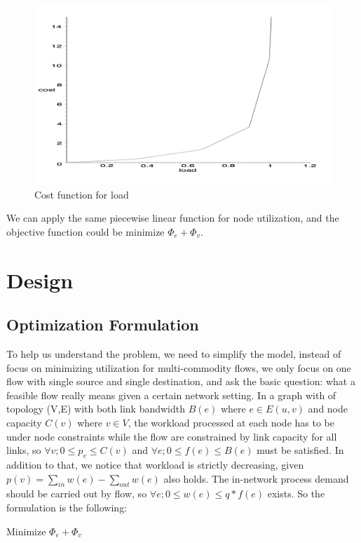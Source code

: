 \documentclass{sig-alternate}
\begin{document}
\begin{figure}
\includegraphics[scale=0.25]{piecewise.png} 
\caption{Cost function for load \label{figure1}}
 \end{figure}
 
 We can apply the same piecewise linear function for node utilization, and the objective function could be minimize 
 $\Phi_e + \Phi_v$.



\section{Design}
\subsection{Optimization Formulation}
To help us understand the problem, we need to simplify the model, instead of focus on minimizing utilization for multi-commodity flows, we only focus on one flow with single source and single destination, and ask the basic question: what a feasible flow really means given a certain network setting. In a graph with of topology (V,E) with both link bandwidth $B(e)$ where $e \in E(u,v)$ and node capacity $C(v)$ where $v \in V$, the workload processed at each node has to be under node constraints while the flow are constrained by link capacity for all links, so 
$\forall v; 0\leq p_v\leq C(v) $ and $\forall e; 0\leq f(e)\leq B(e)$ must be satisfied. In addition to that, we notice that workload is strictly decreasing, given $p(v) = \sum\limits_{in } w(e) - \sum\limits_{out} w(e)$ also holds. The in-network process demand should be carried out by flow, so $\forall e; 0\leq w(e) \leq q*f(e)$ exists. So the formulation is the following:

Minimize  $\Phi_e + \Phi_v$
\end{document}
